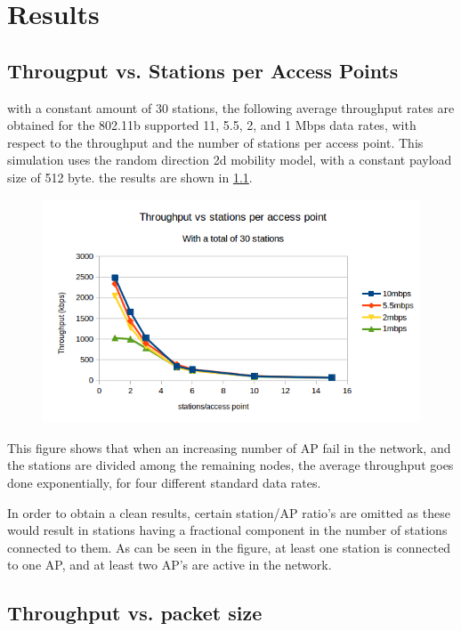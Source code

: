 \chapter{Results} 

\section{Througput vs. Stations per Access Points}

with a constant amount of 30 stations, the following average throughput rates are obtained for the 802.11b supported 11, 5.5, 2, and 1 Mbps data rates, with respect 
to the throughput and the number of stations per access point. This simulation uses the random direction 2d mobility model, with 
a constant payload size of 512 byte. the results are shown in \ref{fig:throughputvsstationsperaccesspoint}. 

\begin{figure}[h]
\centering
\includegraphics[width=0.7\linewidth]{"figures/throughput vs stations per access point"}
\caption[throughput vs stations per access node]{}
\label{fig:throughputvsstationsperaccesspoint}
\end{figure}

This figure shows that when an increasing number of AP fail in the network, and the stations are divided among the remaining nodes, the average throughput goes done exponentially, for four different standard data rates. 

In order to obtain a clean results, certain station/AP ratio's are omitted as these would result in stations having a fractional component in the number of stations connected to them. As can be seen in the figure, at least one station is connected to one AP, and at least two AP's are active in the network.   

\section{Throughput vs. packet size}

